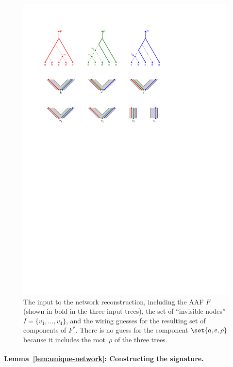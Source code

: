 \begin{figure}[h]
  \centering
  \includegraphics{../figs/ch4/reconstruction-input-trees}
  \caption{The input to the network reconstruction, including the AAF $F$ (shown
    in bold in the three input trees), {the set of ``invisible nodes'' $I=\{v_1,\ldots ,v_4\}$}, and the wiring guesses
    for the resulting set of components of $F^*$. There is no guess for the component $\set{a, e, \rho}$ because it includes
    the root~{$\rho$} of the three trees.}
  \label{fig:reconstruction-input}
\end{figure}

\paragraph{Lemma~\ref{lem:unique-network}: Constructing the signature.}

